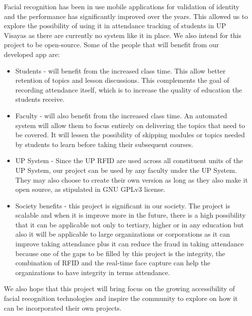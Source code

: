 	Facial recognition has been in use mobile applications for validation of identity and the performance has significantly improved over the years. This allowed us to explore the possibility of using it in attendance tracking of students in UP Visayas as there are currently no system like it in place. We also intend for this project to be open-source. Some of the people that will benefit from our developed app are:
	
	\begin{itemize}
		\item Students - will benefit from the increased class time. This allow better retention of topics and lesson discussions. This complements the goal of recording attendance itself, which is to increase the quality of education the students receive.
	\end{itemize}
	\begin{itemize}
		\item Faculty - will also benefit from the increased class time. An automated system will allow them to focus entirely on delivering the topics that need to be covered. It will lessen the possibility of skipping modules or topics needed by students to learn before taking their subsequent courses. 
	\end{itemize}
	\begin{itemize}
		\item UP System - Since the UP RFID are used across all constituent units of the UP System, our project can be used by any faculty under the UP System. They may also choose to create their own version as long as they also make it open source, as stipulated in GNU GPLv3 license.
	\end{itemize}
	\begin{itemize}
		\item Society benefits - this project is significant in our society. The project is scalable and when it is improve more in the future, there is a high possibility that it can be applicable not only to tertiary, higher or in any education but also it will be applicable to large organizations or corporations as it can improve taking attendance plus it can reduce the fraud in taking attendance because one of the gaps to be filled by this project is the integrity, the combination of RFID and the real-time face capture can help the organizations to have integrity in terms attendance. 
		
	\end{itemize}
	
	
	We also hope that this project will bring focus on the growing accessibility of facial recognition technologies and inspire the community to explore on how it can be incorporated their own projects.
	

